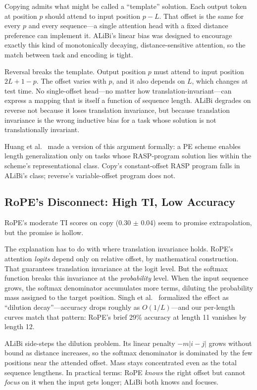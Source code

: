 \documentclass[10pt,twocolumn]{article}
\begin{document}
Copying admits what might be called a ``template'' solution.
Each output token at position $p$ should attend to input position $p - L$.
That offset is the same for every $p$ and every sequence---a single attention head with a fixed distance preference can implement it.
ALiBi's linear bias was designed to encourage exactly this kind of monotonically decaying, distance-sensitive attention, so the match between task and encoding is tight.

Reversal breaks the template.
Output position $p$ must attend to input position $2L + 1 - p$.
The offset varies with $p$, and it also depends on $L$, which changes at test time.
No single-offset head---no matter how translation-invariant---can express a mapping that is itself a function of sequence length.
ALiBi degrades on reverse not because it loses translation invariance, but because translation invariance is the wrong inductive bias for a task whose solution is not translationally invariant.

Huang et al.~\cite{huang2025formal} made a version of this argument formally: a PE scheme enables length generalization only on tasks whose RASP-program solution lies within the scheme's representational class.
Copy's constant-offset RASP program falls in ALiBi's class; reverse's variable-offset program does not.

\subsection{RoPE's Disconnect: High TI, Low Accuracy}
\label{sec:rope_paradox}

RoPE's moderate TI scores on copy (0.30 $\pm$ 0.04) seem to promise extrapolation, but the promise is hollow.

The explanation has to do with where translation invariance holds.
RoPE's attention \emph{logits} depend only on relative offset, by mathematical construction.
That guarantees translation invariance at the logit level.
But the softmax function breaks this invariance at the \emph{probability} level.
When the input sequence grows, the softmax denominator accumulates more terms, diluting the probability mass assigned to the target position.
Singh et al.~\cite{singh2026relative} formalized the effect as ``dilution decay''---accuracy drops roughly as $O(1/L)$---and our per-length curves match that pattern: RoPE's brief 29\% accuracy at length 11 vanishes by length 12.

ALiBi side-steps the dilution problem.
Its linear penalty $-m|i-j|$ grows without bound as distance increases, so the softmax denominator is dominated by the few positions near the attended offset.
Mass stays concentrated even as the total sequence lengthens.
In practical terms: RoPE \emph{knows} the right offset but cannot \emph{focus} on it when the input gets longer; ALiBi both knows and focuses.
\end{document}
